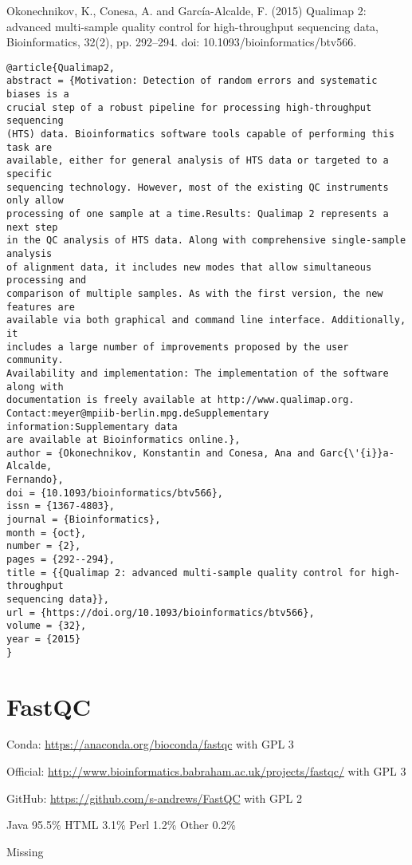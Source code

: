 \documentclass[]{article}
\begin{document}
Okonechnikov, K., Conesa, A. and García-Alcalde, F. (2015) Qualimap 2: advanced multi-sample quality control for high-throughput sequencing data, Bioinformatics, 32(2), pp. 292–294. doi: 10.1093/bioinformatics/btv566.

\begin{verbatim}
@article{Qualimap2,
abstract = {Motivation: Detection of random errors and systematic biases is a
crucial step of a robust pipeline for processing high-throughput sequencing
(HTS) data. Bioinformatics software tools capable of performing this task are
available, either for general analysis of HTS data or targeted to a specific
sequencing technology. However, most of the existing QC instruments only allow
processing of one sample at a time.Results: Qualimap 2 represents a next step
in the QC analysis of HTS data. Along with comprehensive single-sample analysis
of alignment data, it includes new modes that allow simultaneous processing and
comparison of multiple samples. As with the first version, the new features are
available via both graphical and command line interface. Additionally, it
includes a large number of improvements proposed by the user community.
Availability and implementation: The implementation of the software along with
documentation is freely available at http://www.qualimap.org.
Contact:meyer@mpiib-berlin.mpg.deSupplementary information:Supplementary data
are available at Bioinformatics online.},
author = {Okonechnikov, Konstantin and Conesa, Ana and Garc{\'{i}}a-Alcalde, 
Fernando},
doi = {10.1093/bioinformatics/btv566},
issn = {1367-4803},
journal = {Bioinformatics},
month = {oct},
number = {2},
pages = {292--294},
title = {{Qualimap 2: advanced multi-sample quality control for high-throughput 
sequencing data}},
url = {https://doi.org/10.1093/bioinformatics/btv566},
volume = {32},
year = {2015}
}
\end{verbatim}

\section{FastQC}

Conda: \url{https://anaconda.org/bioconda/fastqc} with GPL 3

Official: \url{http://www.bioinformatics.babraham.ac.uk/projects/fastqc/} with GPL 3

GitHub: \url{https://github.com/s-andrews/FastQC} with GPL 2

Java 95.5\% HTML 3.1\% Perl 1.2\% Other 0.2\%

Missing
\end{document}
